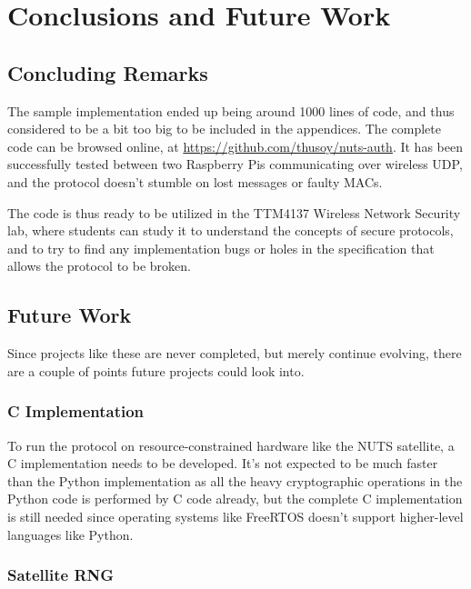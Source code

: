 \chapter{Conclusions and Future Work}
\label{chp:conclusions}

\section{Concluding Remarks}\label{sec:conclusions}

The sample implementation ended up being around 1000 lines of code, and thus considered to be a bit too big to be included in the appendices. The complete code can be browsed online, at \url{https://github.com/thusoy/nuts-auth}. It has been successfully tested between two Raspberry Pis communicating over wireless UDP, and the protocol doesn't stumble on lost messages or faulty MACs.

The code is thus ready to be utilized in the TTM4137 Wireless Network Security lab, where students can study it to understand the concepts of secure protocols, and to try to find any implementation bugs or holes in the specification that allows the protocol to be broken.


\section{Future Work}\label{sec:future_work}

Since projects like these are never completed, but merely continue evolving, there are a couple of points future projects could look into.

    \subsection{C Implementation}

To run the protocol on resource-constrained hardware like the NUTS satellite, a C implementation needs to be developed. It's not expected to be much faster than the Python implementation as all the heavy cryptographic operations in the Python code is performed by C code already, but the complete C implementation is still needed since operating systems like FreeRTOS doesn't support higher-level languages like Python.


    \subsection{Satellite RNG}

